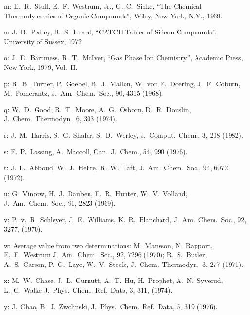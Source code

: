 \begin{description}
\item{   m: } D.\ R.\ Stull, E.\ F.\ Westrum, Jr., G.\ C.\ Sinke, ``The Chemical Thermodynamics
       of Organic Compounds'', Wiley, New York, N.Y., 1969.
  
\item{   n: } J.\ B.\ Pedley, B.\ S.\ Iseard, ``CATCH Tables of Silicon Compounds'', University
       of Sussex, 1972
  
\item{   o: } J.\ E.\ Bartmess, R.\ T.\ McIver, ``Gas Phase Ion Chemistry'', Academic Press,
       New York, 1979, Vol.\ II.
  
\item{   p: } R.\ B.\ Turner, P.\ Goebel, B.\ J.\ Mallon, W.\ von E.\ Doering, J.\ F.\ Coburn,
       M.\ Pomerantz, J.\ Am.\ Chem.\ Soc., 90, 4315 (1968).
  
\item{   q: } W.\ D.\ Good, R.\ T.\ Moore, A.\ G.\ Osborn, D.\ R.\ Douslin, J.\ Chem.\
       Thermodyn., 6, 303 (1974).
  
\item{   r: } J.\ M.\ Harris, S.\ G.\ Shafer, S.\ D.\ Worley, J.\ Comput.\ Chem., 3, 208 (1982).
  
\item{   s: } F.\ P.\ Lossing, A.\ Maccoll, Can.\ J.\ Chem., 54, 990 (1976).
  
\item{   t: } J.\ L.\ Abboud, W.\ J.\ Hehre, R.\ W.\ Taft, J.\ Am.\ Chem.\ Soc., 94, 6072
       (1972).
  
\item{   u: } G.\ Vincow, H.\ J.\ Dauben, F.\ R.\ Hunter, W.\ V.\ Volland, J.\ Am.\ Chem.\ Soc.,
       91, 2823 (1969).
  
\item{   v: } P.\ v.\ R.\ Schleyer, J.\ E.\ Williams, K.\ R.\ Blanchard, J.\ Am.\ Chem.\ Soc.,
       92, 3277, (1970).
  
\item{   w: } Average value from two determinations: M.\ Mansson, N.\ Rapport, E.\ F.\ Westrum
       J.\ Am.\ Chem.\ Soc., 92, 7296 (1970); R.\ S.\ Butler, A.\ S.\ Carson,
       P.\ G.\ Laye, W.\ V.\ Steele, J.\ Chem.\ Thermodyn.\ 3, 277 (1971).
  
\item{   x: } M.\ W.\ Chase, J.\ L.\ Curnutt, A.\ T.\ Hu, H.\ Prophet, A.\ N.\ Syverud, L.\ C.\ Walke
       J.\ Phys.\ Chem.\ Ref.\ Data, 3, 311, (1974).
  
\item{   y: } J.\ Chao, B.\ J.\ Zwolinski, J.\ Phys.\ Chem.\ Ref.\ Data, 5, 319 (1976).
  

\end{description}
